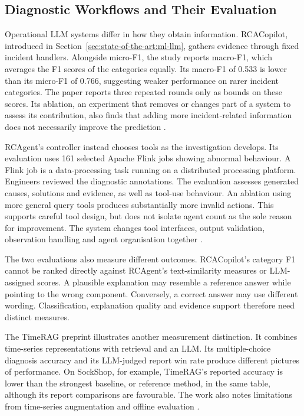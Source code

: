 \subsection{Diagnostic Workflows and Their Evaluation}

Operational LLM systems differ in how they obtain information. RCACopilot,
introduced in Section~\ref{sec:state-of-the-art:ml-llm}, gathers evidence
through fixed incident handlers. Alongside micro-F1, the study reports
macro-F1, which averages the F1 scores of the categories equally. Its
macro-F1 of 0.533 is lower than its micro-F1 of 0.766, suggesting weaker
performance on rarer incident categories. The paper reports three repeated
rounds only as bounds on these scores. Its ablation, an experiment that
removes or changes part of a system to assess its contribution,
also finds that adding more incident-related information does not
necessarily improve the prediction
\parencite[Sections~5.1--5.6]{chen2024rcacopilot}.

RCAgent's controller instead chooses tools as the investigation develops.
Its evaluation uses 161 selected Apache Flink jobs showing abnormal
behaviour. A Flink job is a data-processing task running on a distributed
processing platform. Engineers reviewed the diagnostic annotations. The
evaluation assesses generated causes, solutions and evidence, as well as
tool-use behaviour. An ablation using more general
query tools produces substantially more invalid actions. This supports
careful tool design, but does not isolate agent count as the sole reason
for improvement. The system changes tool interfaces, output validation,
observation handling and agent organisation together
\parencite[Sections~4--5]{wang2024rcagent}.

The two evaluations also measure different outcomes. RCACopilot's category
F1 cannot be ranked directly against RCAgent's text-similarity measures or
LLM-assigned scores. A plausible explanation may resemble a reference
answer while pointing to the wrong component. Conversely, a correct answer
may use different wording. Classification, explanation quality and evidence
support therefore need distinct measures.

The TimeRAG preprint illustrates another measurement distinction. It
combines time-series representations with retrieval and an LLM. Its
multiple-choice diagnosis accuracy and its LLM-judged report win rate
produce different pictures of performance. On SockShop, for example,
TimeRAG's reported accuracy is lower than the strongest baseline, or
reference method, in the
same table, although its report comparisons are favourable. The work also
notes limitations from time-series augmentation and offline evaluation
\parencite[Sections~4--6, Tables~2--3]{park2026timerag}.

